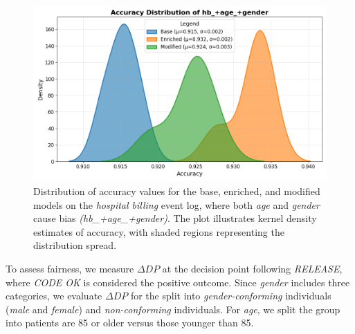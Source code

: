 \begin{figure}[h!]
    \centering
    \includegraphics[width=\imagewidth]{gfx/hb_accuracy.png}
    \caption{Distribution of accuracy values for the base, enriched, and modified models on the \textit{hospital billing} event log,
    where both \textit{age} and \textit{gender} cause bias \textit{(hb\_+age\_+gender)}.
    The plot illustrates kernel density estimates of accuracy, with shaded regions representing the distribution spread.}
    \label{fig:hb_accuracy}
\end{figure}

To assess fairness, we measure \(\Delta \textit{DP}\) at the decision point following \textit{RELEASE},
where \textit{CODE OK} is considered the positive outcome.
Since \textit{gender} includes three categories,
we evaluate \(\Delta \textit{DP}\) for the split into \textit{gender-conforming} individuals (\textit{male} and \textit{female})
and \textit{non-conforming} individuals.
For \textit{age}, we split the group into patients are 85 or older versus those younger than 85.

